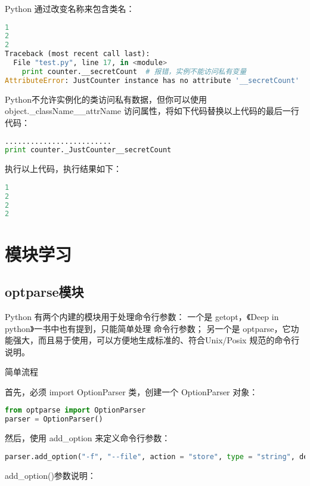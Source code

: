 Python 通过改变名称来包含类名：
\begin{lstlisting}[language=Python]
1
2
2
Traceback (most recent call last):
  File "test.py", line 17, in <module>
    print counter.__secretCount  # 报错，实例不能访问私有变量
AttributeError: JustCounter instance has no attribute '__secretCount'
\end{lstlisting}

Python不允许实例化的类访问私有数据，但你可以使用 object.\_className\_\_attrName 访问属性，将如下代码替换以上代码的最后一行代码：
\begin{lstlisting}[language=Python]
.........................
print counter._JustCounter__secretCount
\end{lstlisting}

执行以上代码，执行结果如下：
\begin{lstlisting}[language=Python]
1
2
2
2
\end{lstlisting}


\section{模块学习}
\subsection{optparse模块}
Python 有两个内建的模块用于处理命令行参数：
一个是 getopt，《Deep in python》一书中也有提到，只能简单处理 命令行参数；
另一个是 optparse，它功能强大，而且易于使用，可以方便地生成标准的、符合Unix/Posix 规范的命令行说明。

简单流程

首先，必须 import OptionParser 类，创建一个 OptionParser 对象：
\begin{lstlisting}[language=Python]
from optparse import OptionParser  
parser = OptionParser() 
\end{lstlisting}

然后，使用 add\_option 来定义命令行参数：
\begin{lstlisting}[language=Python]
parser.add_option("-f", "--file", action = "store", type = "string", dest = "fileName")
\end{lstlisting}

add\_option()参数说明：

